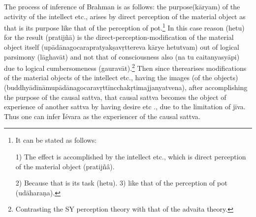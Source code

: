 \vskip -2pt


\vskip -2pt


\vskip -2pt


\vskip -2pt

The process of inference of Brahman is as follows: the purpose\break (kāryam) of the activity of the intellect etc., arises by direct perception of the material object as that is its purpose like that of the perception of pot.\footnote{It can be stated as follows:

1) The effect is accomplished by the intellect etc., which is direct perception of the material object (pratijñâ).

2) Because that is its task (hetu). 3) like that of the perception of pot (udāharaṇa).} In this case reason (hetu) for the result (pratijñā) is the direct-perception-modification of the material object itself (upādānagocarapratyakṣavṛttereva kārye hetutvam) out of logical parsimony (lāghavāt) and not that of consciousness also (na tu caitanyasyā\-pi) due to logical cumbersomeness (gauravāt).\footnote{Contrasting the SY perception theory with that of the advaita theory.} Then since there\break arises modifications of the material objects of the intellect etc., having the images (of the objects) (buddhyādīnāmupādānagocaravṛttīncchakṛtimajjanyatvena), after accomplishing the purpose of the causal sattva, that causal sattva becomes the object of experience of another sattva by having desire etc ., due to the limitation of jīva. Thus one can infer Īśvara as the experiencer of the causal sattva.

